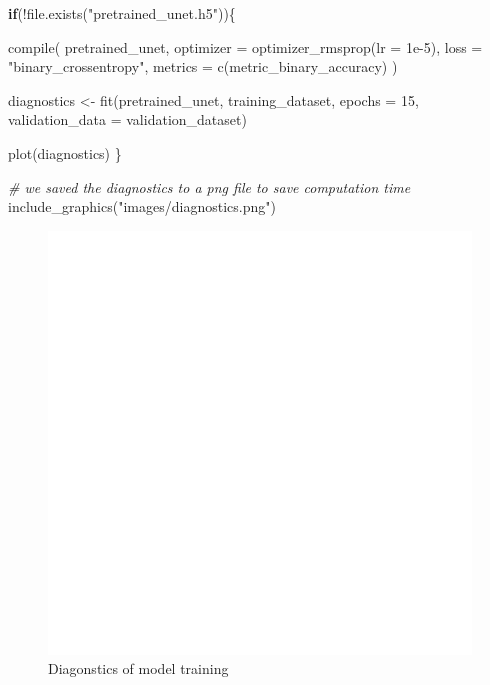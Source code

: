 \documentclass[
]{article}
\newenvironment{Shaded}{\begin{snugshade}}{\end{snugshade}}
\newcommand{\AttributeTok}[1]{\textcolor[rgb]{0.77,0.63,0.00}{#1}}
\newcommand{\CommentTok}[1]{\textcolor[rgb]{0.56,0.35,0.01}{\textit{#1}}}
\newcommand{\ControlFlowTok}[1]{\textcolor[rgb]{0.13,0.29,0.53}{\textbf{#1}}}
\newcommand{\DecValTok}[1]{\textcolor[rgb]{0.00,0.00,0.81}{#1}}
\newcommand{\FloatTok}[1]{\textcolor[rgb]{0.00,0.00,0.81}{#1}}
\newcommand{\FunctionTok}[1]{\textcolor[rgb]{0.00,0.00,0.00}{#1}}
\newcommand{\NormalTok}[1]{#1}
\newcommand{\OtherTok}[1]{\textcolor[rgb]{0.56,0.35,0.01}{#1}}
\newcommand{\SpecialCharTok}[1]{\textcolor[rgb]{0.00,0.00,0.00}{#1}}
\newcommand{\StringTok}[1]{\textcolor[rgb]{0.31,0.60,0.02}{#1}}
\begin{document}
\begin{Shaded}
\begin{Highlighting}[]
\ControlFlowTok{if}\NormalTok{(}\SpecialCharTok{!}\FunctionTok{file.exists}\NormalTok{(}\StringTok{"pretrained\_unet.h5"}\NormalTok{))\{}
   
  \FunctionTok{compile}\NormalTok{(}
\NormalTok{    pretrained\_unet,}
    \AttributeTok{optimizer =} \FunctionTok{optimizer\_rmsprop}\NormalTok{(}\AttributeTok{lr =} \FloatTok{1e{-}5}\NormalTok{),}
    \AttributeTok{loss =} \StringTok{"binary\_crossentropy"}\NormalTok{,}
    \AttributeTok{metrics =} \FunctionTok{c}\NormalTok{(metric\_binary\_accuracy)}
\NormalTok{    )}
  
  
\NormalTok{  diagnostics }\OtherTok{\textless{}{-}} \FunctionTok{fit}\NormalTok{(pretrained\_unet,}
\NormalTok{                 training\_dataset,}
                 \AttributeTok{epochs =} \DecValTok{15}\NormalTok{,}
                 \AttributeTok{validation\_data =}\NormalTok{ validation\_dataset)}
  
  \FunctionTok{plot}\NormalTok{(diagnostics)}
\NormalTok{\}}
\end{Highlighting}
\end{Shaded}

\begin{Shaded}
\begin{Highlighting}[]
\CommentTok{\# we saved the diagnostics to a png file to save computation time}
\FunctionTok{include\_graphics}\NormalTok{(}\StringTok{"images/diagnostics.png"}\NormalTok{)}
\end{Highlighting}
\end{Shaded}

\begin{figure}

{\centering \includegraphics[width=6.67in]{images/diagnostics} 

}

\caption{Diagonstics of model training}\label{fig:plot diagnostics}
\end{figure}
\end{document}
